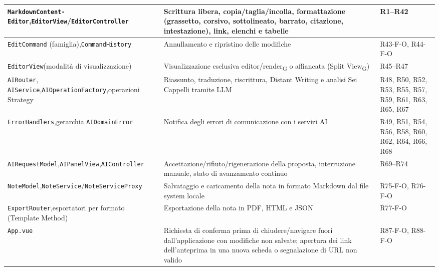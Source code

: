 \begin{xltabular}{\textwidth}{|>{\raggedright\arraybackslash\small}p{3.4cm}|X|>{\raggedright\arraybackslash\small}p{2.6cm}|}
	\texttt{MarkdownContent-}\newline\texttt{Editor},\newline \texttt{EditorView}/\newline\texttt{EditorController} & Scrittura libera, copia/taglia/incolla, formattazione (grassetto, corsivo, sottolineato, barrato, citazione, intestazione), link, elenchi e tabelle & R1--R42 \\ \hline
	\texttt{EditCommand} (famiglia),\newline \texttt{CommandHistory} & Annullamento e ripristino delle modifiche & R43-F-O, R44-F-O \\ \hline
	\texttt{EditorView}\newline (modalità di visualizzazione) & Visualizzazione esclusiva editor/render\textsubscript{G} o affiancata (Split View\textsubscript{G}) & R45--R47 \\ \hline
	\texttt{AIRouter}, \texttt{AIService},\newline \texttt{AIOperationFactory},\newline operazioni Strategy & Riassunto, traduzione, riscrittura, Distant Writing e analisi Sei Cappelli tramite LLM & R48, R50, R52, R53, R55, R57, R59, R61, R63, R65, R67 \\ \hline
	\texttt{ErrorHandlers},\newline gerarchia \texttt{AIDomainError} & Notifica degli errori di comunicazione con i servizi AI & R49, R51, R54, R56, R58, R60, R62, R64, R66, R68 \\ \hline
	\texttt{AIRequestModel},\newline \texttt{AIPanelView},\newline \texttt{AIController} & Accettazione/rifiuto/rigenerazione della proposta, interruzione manuale, stato di avanzamento continuo & R69--R74 \\ \hline
	\texttt{NoteModel},\newline \texttt{NoteService}/\newline\texttt{NoteServiceProxy} & Salvataggio e caricamento della nota in formato Markdown dal file system locale & R75-F-O, R76-F-O \\ \hline
	\texttt{ExportRouter},\newline esportatori per formato (Template Method) & Esportazione della nota in PDF, HTML e JSON & R77-F-O \\ \hline
	\texttt{App.vue} & Richiesta di conferma prima di chiudere/navigare fuori dall'applicazione con modifiche non salvate; apertura dei link dell'anteprima in una nuova scheda o segnalazione di URL non valido & R87-F-O, R88-F-O \\ \hline

\end{xltabular}
